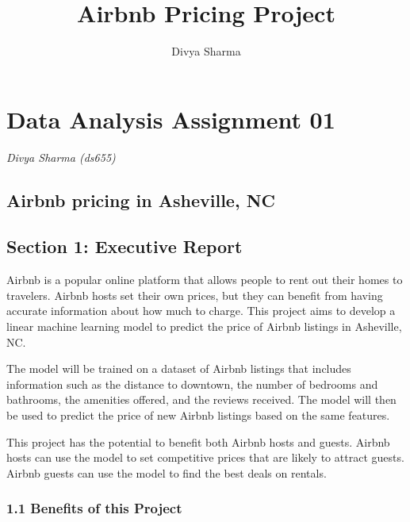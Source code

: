 \documentclass[
  letterpaper,
  DIV=11,
  numbers=noendperiod]{scrartcl}
\title{Airbnb Pricing Project}
\author{Divya Sharma}
\date{}
\begin{document}
\maketitle
\ifdefined\Shaded\renewenvironment{Shaded}{\begin{tcolorbox}[frame hidden, sharp corners, enhanced, boxrule=0pt, interior hidden, breakable, borderline west={3pt}{0pt}{shadecolor}]}{\end{tcolorbox}}\fi

\hypertarget{data-analysis-assignment-01}{%
\section{Data Analysis Assignment
01}\label{data-analysis-assignment-01}}

\emph{Divya Sharma (ds655)}

\hypertarget{airbnb-pricing-in-asheville-nc}{%
\subsection{Airbnb pricing in Asheville,
NC}\label{airbnb-pricing-in-asheville-nc}}

\hypertarget{section-1-executive-report}{%
\subsection{Section 1: Executive
Report}\label{section-1-executive-report}}

Airbnb is a popular online platform that allows people to rent out their
homes to travelers. Airbnb hosts set their own prices, but they can
benefit from having accurate information about how much to charge. This
project aims to develop a linear machine learning model to predict the
price of Airbnb listings in Asheville, NC.

The model will be trained on a dataset of Airbnb listings that includes
information such as the distance to downtown, the number of bedrooms and
bathrooms, the amenities offered, and the reviews received. The model
will then be used to predict the price of new Airbnb listings based on
the same features.

This project has the potential to benefit both Airbnb hosts and guests.
Airbnb hosts can use the model to set competitive prices that are likely
to attract guests. Airbnb guests can use the model to find the best
deals on rentals.

\hypertarget{benefits-of-this-project}{%
\subsubsection{1.1 Benefits of this
Project}\label{benefits-of-this-project}}
\end{document}
